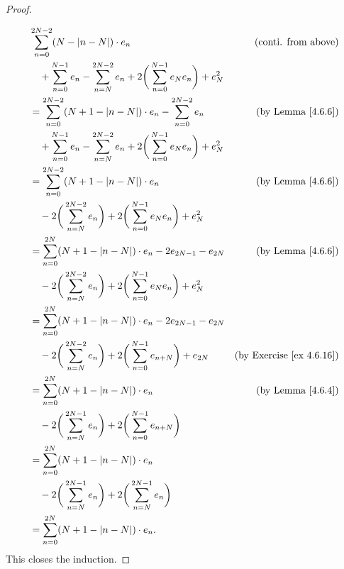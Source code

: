\begin{proof}
\begin{align*}
    \end{align*}
    \begin{align*}
         & \sum_{n = 0}^{2N - 2} (N - \abs*{n - N}) \cdot e_n                                                                & \text{(conti. from above)}           \\
         & \quad + \sum_{n = 0}^{N - 1} e_n - \sum_{n = N}^{2N - 2} e_n + 2 \bigg(\sum_{n = 0}^{N - 1} e_N e_n\bigg) + e_N^2                                        \\
         & = \sum_{n = 0}^{2N - 2} (N + 1 - \abs*{n - N}) \cdot e_n - \sum_{n = 0}^{2N - 2} e_n                              & \text{(by Lemma \ref{4.6.6})}        \\
         & \quad + \sum_{n = 0}^{N - 1} e_n - \sum_{n = N}^{2N - 2} e_n + 2 \bigg(\sum_{n = 0}^{N - 1} e_N e_n\bigg) + e_N^2                                        \\
         & = \sum_{n = 0}^{2N - 2} (N + 1 - \abs*{n - N}) \cdot e_n                                                          & \text{(by Lemma \ref{4.6.6})}        \\
         & \quad - 2 \bigg(\sum_{n = N}^{2N - 2} e_n\bigg) + 2 \bigg(\sum_{n = 0}^{N - 1} e_N e_n\bigg) + e_N^2                                                     \\
         & = \sum_{n = 0}^{2N} (N + 1 - \abs*{n - N}) \cdot e_n - 2 e_{2N - 1} - e_{2N}                                      & \text{(by Lemma \ref{4.6.6})}        \\
         & \quad - 2 \bigg(\sum_{n = N}^{2N - 2} e_n\bigg) + 2 \bigg(\sum_{n = 0}^{N - 1} e_N e_n\bigg) + e_N^2                                                     \\
         & = \sum_{n = 0}^{2N} (N + 1 - \abs*{n - N}) \cdot e_n - 2 e_{2N - 1} - e_{2N}                                                                             \\
         & \quad - 2 \bigg(\sum_{n = N}^{2N - 2} e_n\bigg) + 2 \bigg(\sum_{n = 0}^{N - 1} e_{n + N}\bigg) + e_{2N}           & \text{(by Exercise \ref{ex 4.6.16})} \\
         & = \sum_{n = 0}^{2N} (N + 1 - \abs*{n - N}) \cdot e_n                                                              & \text{(by Lemma \ref{4.6.4})}        \\
         & \quad - 2 \bigg(\sum_{n = N}^{2N - 1} e_n\bigg) + 2 \bigg(\sum_{n = 0}^{N - 1} e_{n + N}\bigg)                                                           \\
         & = \sum_{n = 0}^{2N} (N + 1 - \abs*{n - N}) \cdot e_n                                                                                                     \\
         & \quad - 2 \bigg(\sum_{n = N}^{2N - 1} e_n\bigg) + 2 \bigg(\sum_{n = N}^{2N - 1} e_n\bigg)                                                                \\
         & = \sum_{n = 0}^{2N} (N + 1 - \abs*{n - N}) \cdot e_n.
    \end{align*}
    This closes the induction.


\end{proof}
